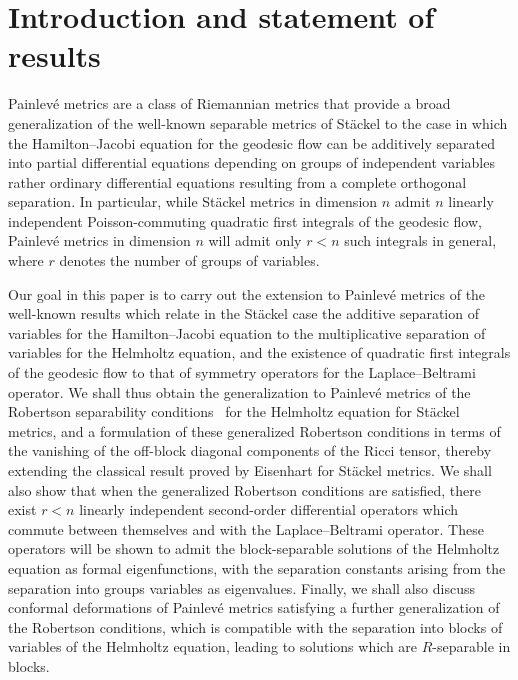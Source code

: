 \section{Introduction and statement of results}
Painlev\'e metrics \cite{Pain1897, Per1990} are a class of Riemannian metrics that provide a broad generalization of the well-known separable metrics of St\"ackel \cite{Eis1934, Sta1897} to the case in which the Hamilton--Jacobi equation for the geodesic flow can be additively separated into partial differential equations depending on groups of independent variables rather ordinary differential equations resulting from a complete orthogonal separation. In particular, while St\"ackel metrics in dimension $n$ admit $n$ linearly independent Poisson-commuting quadratic first integrals of the geodesic flow, Painlev\'e metrics in dimension $n$ will admit only $r<n$ such integrals in general, where $r$ denotes the number of groups of variables.

Our goal in this paper is to carry out the extension to Painlev\'e metrics of the well-known results \cite{Ben2016, BCR1-2002,BCR2-2002, Eis1934, KaMi1980, KaMi1981, KaMi1984} which relate in the St\"ackel case the additive separation of variables for the Hamilton--Jacobi equation to the multiplicative separation of variables for the Helmholtz equation, and the existence of quadratic first integrals of the geodesic flow to that of symmetry operators for the Laplace--Beltrami operator. We shall thus obtain the generalization to Painlev\'e metrics of the Robertson separability conditions~\cite{Rob1928} for the Helmholtz equation for St\"ackel metrics, and a formulation of these generalized Robertson conditions in terms of the vanishing of the off-block diagonal components of the Ricci tensor, thereby extending the classical result proved by Eisenhart \cite{Eis1934} for St\"ackel metrics. We shall also show that when the generalized Robertson conditions are satisfied, there exist $r<n$ linearly independent second-order differential operators which commute between themselves and with the Laplace--Beltrami operator. These operators will be shown to admit the block-separable solutions of the Helmholtz equation as formal eigenfunctions, with the separation constants arising from the separation into groups variables as eigenvalues. Finally, we shall also discuss conformal deformations of Painlev\'e metrics satisfying a further generalization of the Robertson conditions, which is compatible with the separation into blocks of variables of the Helmholtz equation, leading to solutions which are $R$-separable in blocks.

